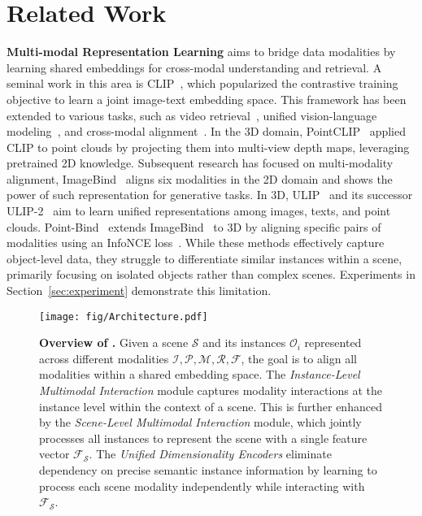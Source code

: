 \section{Related Work}
\label{sec:related_work}

\textbf{Multi-modal Representation Learning} aims to bridge data modalities by learning shared embeddings for cross-modal understanding and retrieval.
A seminal work in this area is CLIP~\cite{Radford2021LearningTV}, which popularized the contrastive training objective to learn a joint image-text embedding space. This framework has been extended to various tasks, such as video retrieval~\cite{Luo2021CLIP4Clip}, unified vision-language modeling~\cite{Luo2020UniVL}, and cross-modal alignment~\cite{gao2021clip,Ma2022XCLIP}. In the 3D domain, PointCLIP~\cite{zhang2021pointclip} applied CLIP to point clouds by projecting them into multi-view depth maps, leveraging pretrained 2D knowledge. Subsequent research has focused on multi-modality alignment, \eg ImageBind~\cite{girdhar2023imagebind} aligns six modalities in the 2D domain and shows the power of such representation for generative tasks. In 3D, ULIP~\cite{xue2022ulip} and its successor ULIP-2~\cite{xue2023ulip2} aim to learn unified representations among images, texts, and point clouds. Point-Bind~\cite{pointbind} extends ImageBind~\cite{girdhar2023imagebind} to 3D by aligning specific pairs of modalities using an InfoNCE loss~\cite{oord2018representation}. While these methods effectively capture object-level data, they struggle to differentiate similar instances within a scene, primarily focusing on isolated objects rather than complex scenes. Experiments in Section~\ref{sec:experiment} demonstrate this limitation.


\begin{figure*}[ht!]
    \centering
    \texttt{[image: fig/Architecture.pdf]}
    \caption{\textbf{Overview of \project{}.} Given a scene $\mathcal{S}$ and its instances $\mathcal{O}_i$ represented across different modalities $\mathcal{I}, \mathcal{P}, \mathcal{M}, \mathcal{R}, \mathcal{F}$, the goal is to align all modalities within a shared embedding space. The \textit{Instance-Level Multimodal Interaction} module captures modality interactions at the instance level within the context of a scene. This is further enhanced by the \textit{Scene-Level Multimodal Interaction} module, which jointly processes all instances to represent the scene with a single feature vector $\mathcal{F_S}$. The \textit{Unified Dimensionality Encoders} eliminate dependency on precise semantic instance information by learning to process each scene modality independently while interacting with $\mathcal{F_S}$.}
    \label{fig:architecture}
    \vspace{-1mm}
\end{figure*}

